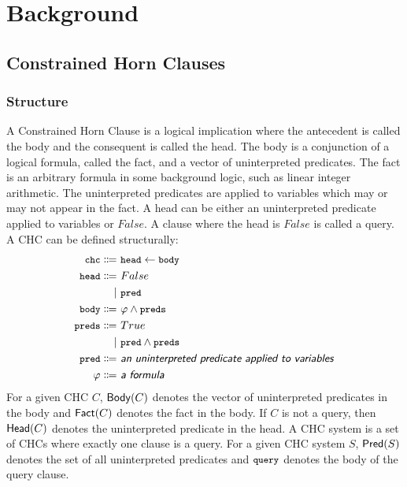 \section{Background}
\label{sec:background}

\subsection{Constrained Horn Clauses}
\label{sec:chcs}

\subsubsection{Structure}
A Constrained Horn Clause is a logical implication where the
antecedent is called the body and the consequent is called the head.
%
The body is a conjunction of a logical formula, called the fact,
and a vector of uninterpreted predicates. The fact is an arbitrary
formula in some background logic, such as linear integer arithmetic.
%
The uninterpreted predicates are applied to variables which may or may
not appear in the fact.
%
A head can be either an uninterpreted predicate applied to variables or $False$.
%
A clause where the head is $False$ is called a query. A CHC can be
defined structurally:
\begin{align*}
\cc{chc} \Coloneqq&~\cc{head} \gets \cc{body} \\
\cc{head} \Coloneqq&~False \\
  \mid&~\cc{pred} \\
\cc{body} \Coloneqq&~\varphi \wedge \cc{preds} \\
\cc{preds} \Coloneqq&~True \\
  \mid&~\cc{pred} \wedge \cc{preds} \\
\cc{pred} \Coloneqq&~\textsf{\emph{an uninterpreted predicate applied to variables}} \\
\varphi \Coloneqq&~\textsf{\emph{a formula}} \\
\end{align*}
%
For a given CHC $C$, $\mathsf{Body}(C)$ denotes the vector of uninterpreted
predicates in the body and $\mathsf{Fact}(C)$ denotes the fact in the
body.
%
If $C$ is not a query, then $\mathsf{Head}(C)$ denotes the uninterpreted
predicate in the head.
%
A CHC system is a set of CHCs where exactly one clause is a query.
%
For a given CHC system $S$, $\mathsf{Pred}( S )$ denotes the set of all
uninterpreted predicates and $\cc{query}$ denotes the body of the
query clause.


